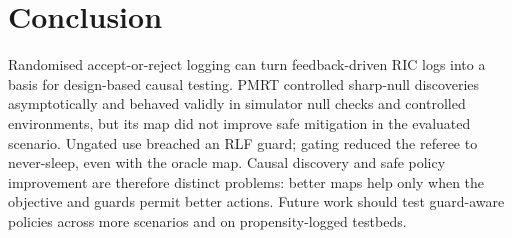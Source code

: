 \section{Conclusion}
\label{sec:conclusion}

Randomised accept-or-reject logging can turn feedback-driven RIC logs into a basis for design-based causal testing.
PMRT controlled sharp-null discoveries asymptotically and behaved validly in simulator null checks and controlled
environments, but its map did not improve safe mitigation in the evaluated scenario. Ungated use breached an RLF
guard; gating reduced the referee to never-sleep, even with the oracle map. Causal discovery and safe policy
improvement are therefore distinct problems: better maps help only when the objective and guards permit better
actions. Future work should test guard-aware policies across more scenarios and on propensity-logged testbeds.
